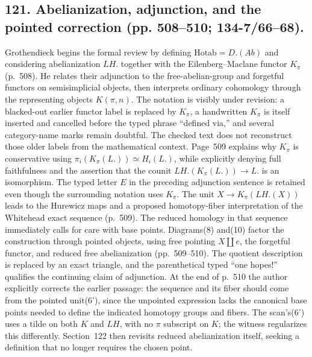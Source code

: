 \documentclass[10pt,oneside]{book}
\begin{document}
\subsection*{121. Abelianization, adjunction, and the pointed correction (pp. 508--510; 134-7/66--68).}
Grothendieck begins the formal review by defining $\mathrm{Hotab}=D.(Ab)$ and considering abel\-ian\-iza\-tion $LH.$ together with the Eilenberg--Maclane functor $K_\pi$ (p.~508). He relates their adjunction to the free-abelian-group and forgetful functors on semisimplicial objects, then interprets ordinary cohomology through the representing objects $K(\pi,n)$. The notation is visibly under revision: a blacked-out earlier functor label is replaced by $K_\pi$, a handwritten $K_\pi$ is itself inserted and cancelled before the typed phrase ``defined via,'' and several category-name marks remain doubtful. The checked text does not reconstruct those older labels from the mathematical context. Page~509 explains why $K_\pi$ is conservative using $\pi_i(K_\pi(L.))\simeq H_i(L.)$, while explicitly denying full faithfulness and the assertion that the counit $LH.(K_\pi(L.))\to L.$ is an isomorphism. The typed letter $E$ in the preceding adjunction sentence is retained even though the surrounding notation uses $K_\pi$. The unit $X\to K_\pi(LH.(X))$ leads to the Hurewicz maps and a proposed homotopy-fiber interpretation of the Whitehead exact sequence (p.~509). The reduced homology in that sequence immediately calls for care with base points. Diagrams(8) and(10) factor the construction through pointed objects, using free pointing $X\amalg e$, the forgetful functor, and reduced free abelianization (pp.~509--510). The quotient description is replaced by an exact triangle, and the parenthetical typed ``one hopes!'' qualifies the continuing claim of adjunction. At the end of p.~510 the author explicitly corrects the earlier passage: the sequence and its fiber should come from the pointed unit(6'), since the unpointed expression lacks the canonical base points needed to define the indicated homotopy groups and fibers. The scan's(6') uses a tilde on both $K$ and $LH$, with no $\pi$ subscript on $K$; the witness regularizes this differently. Section~122 then revisits reduced abelianization itself, seeking a definition that no longer requires the chosen point.
\end{document}
